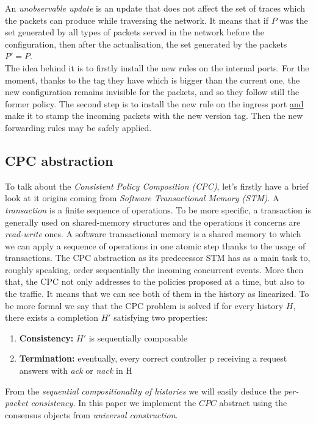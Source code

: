 \documentclass{article}
\theoremstyle{remark}
\begin{document}
An \emph{unobservable update} is an update that does not affect the set of traces which the packets can produce while traversing the network. It means that if $P$ was the set generated by all types of packets served in the network before the configuration, then after the actualisation, the set generated by the packets $P'=P$.\\ 
The idea behind it is to firstly install the new rules on the internal ports. For the moment, thanks to the tag they have which is bigger than the current one, the new configuration remains invisible for the packets, and so they follow still the former policy. The second step is to install the new rule on the ingress port \underline{and} make it to stamp the incoming packets with the new version tag. Then the new forwarding rules may be safely applied.
\subsection{CPC abstraction}
To talk about the \emph{Consistent Policy Composition (CPC)}, let's firstly have a brief look at it origins coming from \emph{Software Transactional Memory (STM)}\cite{Shavit:1995:STM:224964.224987}. A \emph{transaction} is a finite sequence of operations. To be more specific, a transaction is generally used on shared-memory structures and the operations it concerns are \emph{read-write} ones. A software transactional memory is a shared memory to which we can apply a sequence of operations in one atomic step thanks to the usage of transactions.
The CPC abstraction as its predecessor STM has as a main task to, roughly speaking, order sequentially the incoming concurrent events. More then that, the CPC not only addresses to the policies proposed at a time, but also to the traffic. It means that we can see both of them in the history as linearized. To be more formal we say that the CPC problem is solved if for every history $H$, there exists a completion $H'$ satisfying two properties:
\begin{enumerate}
\item \textbf{Consistency:} $H'$ is sequentially composable
\item \textbf{Termination:} eventually, every correct controller p receiving a request answers with \emph{ack} or \emph{nack} in H
\end{enumerate}
From the \emph{sequential compositionality of histories} we will easily deduce the \emph{per-packet consistency.} 
In this paper we implement the $CPC$ abstract using the consensus objects from \emph{universal construction}.
\end{document}
